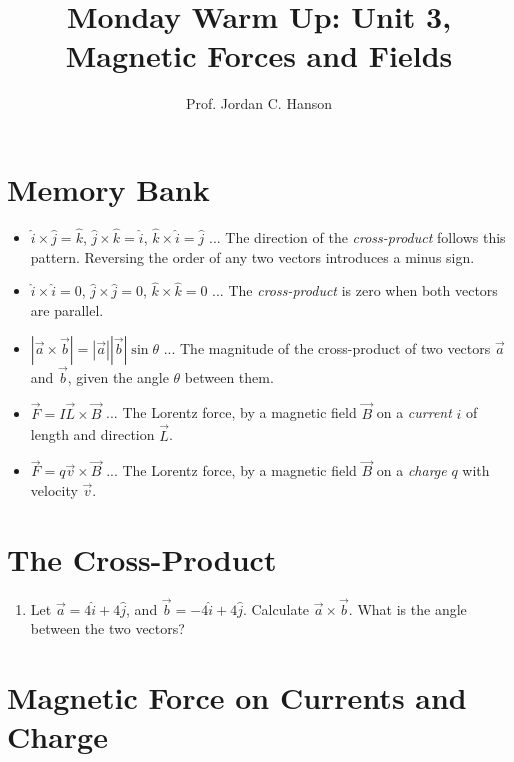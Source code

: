 \documentclass{article}
\begin{document}
\twocolumn

\title{Monday Warm Up: Unit 3, Magnetic Forces and Fields}
\author{Prof. Jordan C. Hanson}

\maketitle

\section{Memory Bank}

\begin{itemize}
\item $\hat{i} \times \hat{j} = \hat{k}$, $\hat{j} \times \hat{k} = \hat{i}$, $\hat{k} \times \hat{i} = \hat{j}$ ... The direction of the \textit{cross-product} follows this pattern.  Reversing the order of any two vectors introduces a minus sign.
\item $\hat{i} \times \hat{i} = 0$, $\hat{j} \times \hat{j} = 0$, $\hat{k} \times \hat{k} = 0$ ... The \textit{cross-product} is zero when both vectors are parallel.
\item $|\vec{a} \times \vec{b}| = |\vec{a}||\vec{b}|\sin\theta$ ... The magnitude of the cross-product of two vectors $\vec{a}$ and $\vec{b}$, given the angle $\theta$ between them.
\item $\vec{F} = I\vec{L} \times \vec{B}$ ... The Lorentz force, by a magnetic field $\vec{B}$ on a \textit{current} $i$ of length and direction $\vec{L}$.
\item $\vec{F} = q\vec{v} \times \vec{B}$ ... The Lorentz force, by a magnetic field $\vec{B}$ on a \textit{charge} $q$ with velocity $\vec{v}$.
\end{itemize}

\section{The Cross-Product}

\begin{enumerate}
\item Let $\vec{a} = 4\hat{i}+4\hat{j}$, and $\vec{b} = -4\hat{i}+4\hat{j}$.  Calculate $\vec{a} \times \vec{b}$.  What is the angle between the two vectors?  \\ \vspace{1cm}
\end{enumerate}

\section{Magnetic Force on Currents and Charge}
\end{document}

